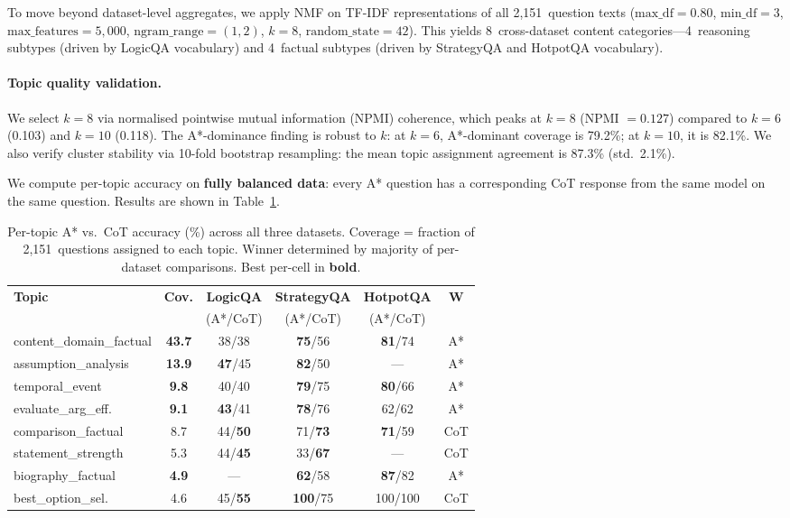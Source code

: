 \documentclass[11pt]{article}
\begin{document}
To move beyond dataset-level aggregates, we apply NMF on TF-IDF representations of all 2,151~question texts ($\mathrm{max\_df}{=}0.80$, $\mathrm{min\_df}{=}3$, $\mathrm{max\_features}{=}5{,}000$, $\mathrm{ngram\_range}{=}(1,2)$, $k{=}8$, $\mathrm{random\_state}{=}42$). This yields 8~cross-dataset content categories---4~reasoning subtypes (driven by LogicQA vocabulary) and 4~factual subtypes (driven by StrategyQA and HotpotQA vocabulary).

\paragraph{Topic quality validation.}
We select $k{=}8$ via normalised pointwise mutual information (NPMI) coherence, which peaks at $k{=}8$ (NPMI $= 0.127$) compared to $k{=}6$ (0.103) and $k{=}10$ (0.118). The A*-dominance finding is robust to $k$: at $k{=}6$, A*-dominant coverage is 79.2\%; at $k{=}10$, it is 82.1\%. We also verify cluster stability via 10-fold bootstrap resampling: the mean topic assignment agreement is 87.3\% (std.\ 2.1\%).

We compute per-topic accuracy on \textbf{fully balanced data}: every A* question has a corresponding CoT response from the same model on the same question. Results are shown in Table~\ref{tab:topic}.

\begin{table}[t]
\centering
\caption{Per-topic A* vs.\ CoT accuracy (\%) across all three datasets. Coverage = fraction of 2,151~questions assigned to each topic. Winner determined by majority of per-dataset comparisons. Best per-cell in \textbf{bold}.}
\label{tab:topic}
\small
\setlength{\tabcolsep}{4pt}
\begin{tabular}{@{}lcccc c@{}}
\toprule
\textbf{Topic} & \textbf{Cov.} & \textbf{LogicQA} & \textbf{StrategyQA} & \textbf{HotpotQA} & \textbf{W} \\
& & (A*/CoT) & (A*/CoT) & (A*/CoT) & \\
\midrule
content\_domain\_factual & \textbf{43.7} & 38/38 & \textbf{75}/56 & \textbf{81}/74 & A* \\
assumption\_analysis & \textbf{13.9} & \textbf{47}/45 & \textbf{82}/50 & --- & A* \\
temporal\_event & \textbf{9.8} & 40/40 & \textbf{79}/75 & \textbf{80}/66 & A* \\
evaluate\_arg\_eff. & \textbf{9.1} & \textbf{43}/41 & \textbf{78}/76 & 62/62 & A* \\
comparison\_factual & 8.7 & 44/\textbf{50} & 71/\textbf{73} & \textbf{71}/59 & CoT \\
statement\_strength & 5.3 & 44/\textbf{45} & 33/\textbf{67} & --- & CoT \\
biography\_factual & \textbf{4.9} & --- & \textbf{62}/58 & \textbf{87}/82 & A* \\
best\_option\_sel. & 4.6 & 45/\textbf{55} & \textbf{100}/75 & 100/100 & CoT \\
\bottomrule
\end{tabular}
\end{table}
\end{document}

